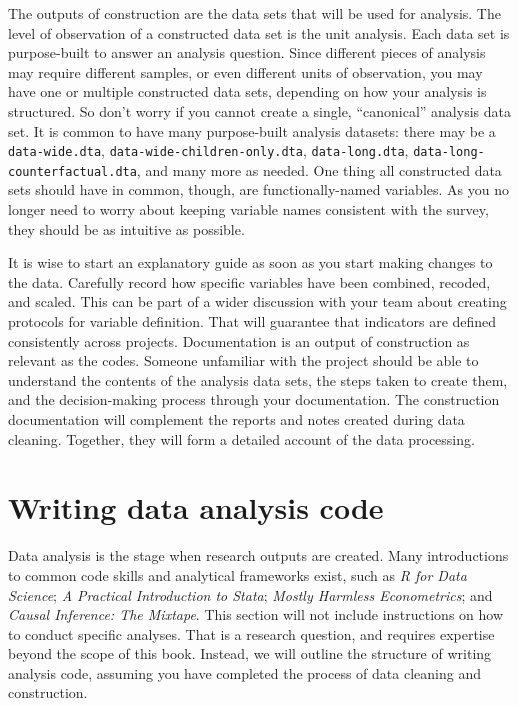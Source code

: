 
The outputs of construction are the data sets that will be used for analysis.
The level of observation of a constructed data set is the unit analysis. 
Each data set is purpose-built to answer an analysis question.
Since different pieces of analysis may require different samples,
or even different units of observation,
you may have one or multiple constructed data sets, 
depending on how your analysis is structured.
So don't worry if you cannot create a single, ``canonical'' analysis data set.
It is common to have many purpose-built analysis datasets:
there may be a \texttt{data-wide.dta},
\texttt{data-wide-children-only.dta}, \texttt{data-long.dta},
\texttt{data-long-counterfactual.dta}, and many more as needed.
One thing all constructed data sets should have in common, though,
are functionally-named variables.
As you no longer need to worry about keeping variable names
consistent with the survey, they should be as intuitive as possible.

It is wise to start an explanatory guide as soon as you start making changes to the data.
Carefully record how specific variables have been combined, recoded, and scaled. 
This can be part of a wider discussion with your team about creating protocols for variable definition.
That will guarantee that indicators are defined consistently across projects.
Documentation is an output of construction as relevant as the codes.
Someone unfamiliar with the project should be able to understand the contents of the analysis data sets, the steps taken to create them, and the decision-making process through your documentation.
The construction documentation will complement the reports and notes created during data cleaning.
Together, they will form a detailed account of the data processing.




\section{Writing data analysis code}

Data analysis is the stage when research outputs are created. 
Many introductions to common code skills and analytical frameworks exist, such as
\textit{R for Data Science};
\textit{A Practical Introduction to Stata};
\textit{Mostly Harmless Econometrics}; 
and \textit{Causal Inference: The Mixtape}.
This section will not include instructions on how to conduct specific analyses.
That is a research question, and requires expertise beyond the scope of this book.
Instead, we will outline the structure of writing analysis code,
assuming you have completed the process of data cleaning and construction.

